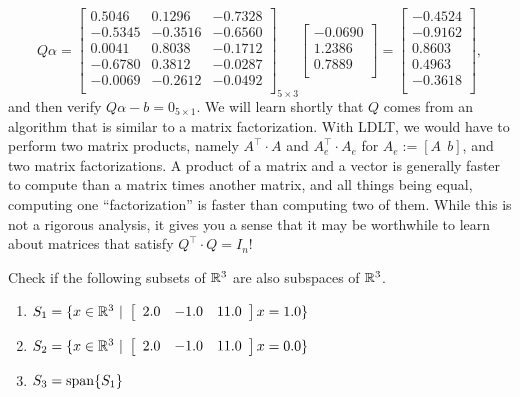 $$
Q \alpha = \left[
\begin{array}{rrr}
0.5046 & 0.1296 & -0.7328 \\
-0.5345 & -0.3516 & -0.6560 \\
0.0041 & 0.8038 & -0.1712 \\
-0.6780 & 0.3812 & -0.0287 \\
-0.0069 & -0.2612 & -0.0492 \\
\end{array}
\right]_{5 \times 3}
\left[
\begin{array}{r}
-0.0690 \\
1.2386 \\
0.7889 \\
\end{array}
\right] = \left[
\begin{array}{r}
-0.4524 \\
-0.9162 \\
0.8603 \\
0.4963 \\
-0.3618 \\
\end{array}
\right],
$$
and then verify $Q \alpha - b = 0_{5 \times 1}$. We will learn shortly that $Q$ comes from an algorithm that is similar to a matrix factorization. With LDLT, we would have to perform two matrix products, namely $A^\top \cdot A$ and $A_e^\top \cdot A_e$ for $A_e:=[A~~b]$, and two matrix factorizations. A product of a matrix and a vector is generally faster to compute than a matrix times another matrix, and all things being equal, computing one ``factorization'' is faster than computing two of them. While this is not a rigorous analysis, it gives you a sense that it may be worthwhile to learn about matrices that satisfy $Q^\top \cdot Q = I_n$!

\begin{example}
\label{ex:AnotherSubspaceExample}  Check if the following subsets of $\mathbb R^3$ are also subspaces of $\mathbb R^3$.

\begin{enumerate}
\renewcommand{\labelenumi}{(\alph{enumi})}
\setlength{\itemsep}{.2cm}
\item $S_1=\{ x\in \mathbb R^3~|~ \left[\begin{array}{ccc} 2.0 &  -1.0 & 11.0\end{array}\right] x = 1.0 \}$ 

\item $S_2=\{ x\in \mathbb R^3~|~ \left[\begin{array}{ccc} 2.0 &  -1.0 & 11.0 \end{array}\right] x = 0.0 \}$


\item $S_3 = \mathrm{span} \{ S_1 \}$
\end{enumerate}
 \end{example}

